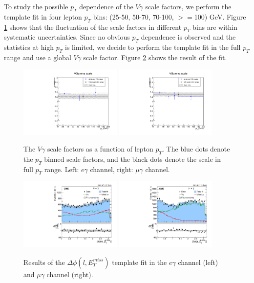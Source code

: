 \documentclass[thesis.tex]{subfiles}
\renewcommand\_{\textunderscore\allowbreak}
\begin{document}
To study the possible $p_T$ dependence of the $V\gamma$ scale factors, we perform the template fit in four lepton $p_T$ bins: (25-50, 50-70, 70-100, $>=$100) GeV. Figure \ref{fig:dphiptdependence} shows that the fluctuation of the scale factors in different $p_T$ bins are within systematic uncertainties. Since no obvious $p_T$ dependence is observed and the statistics at high $p_T$ is limited, we decide to perform the template fit in the full $p_T$ range and use a global $V\gamma$ scale factor. Figure \ref{fig:dphifitresult} shows the result of the fit. 
\begin{figure}[hbtp]
  \centering
    \includegraphics[width=0.45\textwidth]{Figures/scale_ptDependence_eg.pdf}
    \includegraphics[width=0.45\textwidth]{Figures/scale_ptDependence_mg.pdf}
  \caption{The $V\gamma$ scale factors as a function of lepton $p_T$. The blue dots denote the $p_T$ binned scale factors, and the black dots denote the scale in full $p_T$ range. Left: $e\gamma$ channel, right: $\mu\gamma$ channel. }
    \label{fig:dphiptdependence}
\end{figure}

\begin{figure}[hbtp]
  \centering
    \includegraphics[width=0.45\textwidth]{Fig/fit_dPhi_eg.pdf}
    \includegraphics[width=0.45\textwidth]{Fig/fit_dPhi_mg.pdf}
  \caption{Results of the $\Delta\phi(l,E_{T}^{miss})$ template fit in the $e\gamma$ channel (left) and $\mu\gamma$ channel (right).}
    \label{fig:dphifitresult}
\end{figure}
\end{document}
